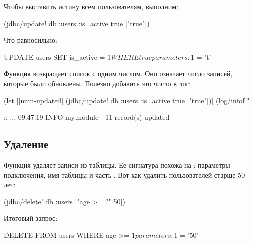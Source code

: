 Чтобы выставить истину всем пользователям, выполним:

\begin{english}
  \begin{clojure}
(jdbc/update! db
              :users
              {:is_active true}
              ["true"])
  \end{clojure}
\end{english}

Что равносильно:

\begin{english}
  \begin{sql}
UPDATE users SET is_active = $1 WHERE true
parameters: $1 = 't'
  \end{sql}
\end{english}

Функция  возвращает список с одним числом. Оно означает число записей, которые были обновлены. Полезно добавить это число в лог:

\begin{english}
  \begin{clojure}
(let [[num-updated]
      (jdbc/update! db :users
                    {:is_active true} ["true"])]
  (log/infof "%

;; ... 09:47:19 INFO  my.module - 11 record(s) updated
  \end{clojure}
\end{english}

\subsection{Удаление}

Функция  удаляет записи из таблицы. Ее сигнатура похожа на : параметры подключения, имя таблицы и часть . Вот как удалить пользователей старше 50 лет:

\begin{english}
  \begin{clojure}
(jdbc/delete! db :users ["age >= ?" 50])
  \end{clojure}
\end{english}

Итоговый запрос:

\begin{english}
  \begin{sql}
DELETE FROM users WHERE age >= $1
parameters: $1 = '50'
  \end{sql}
\end{english}

